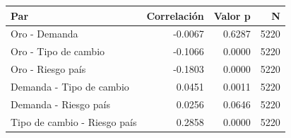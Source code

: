 \begin{tabular}{lrrr}
\toprule
Par & Correlación & Valor p & N \\
\midrule
Oro - Demanda & -0.0067 & 0.6287 & 5220 \\
Oro - Tipo de cambio & -0.1066 & 0.0000 & 5220 \\
Oro - Riesgo país & -0.1803 & 0.0000 & 5220 \\
Demanda - Tipo de cambio & 0.0451 & 0.0011 & 5220 \\
Demanda - Riesgo país & 0.0256 & 0.0646 & 5220 \\
Tipo de cambio - Riesgo país & 0.2858 & 0.0000 & 5220 \\
\bottomrule
\end{tabular}
